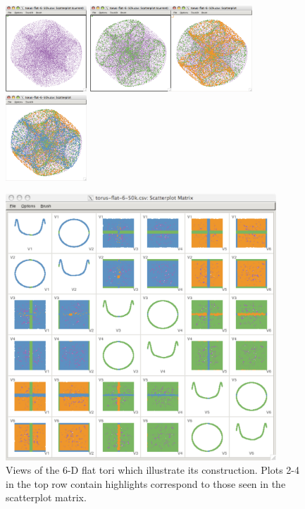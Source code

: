 \documentclass[article]{jss}
\begin{document}
\begin{figure}[ht]
\centerline{\includegraphics[width=1.2in]{torus-flat-6-0.pdf} \includegraphics[width=1.2in]{torus-flat-6-1.pdf}\includegraphics[width=1.2in]{torus-flat-6-2.pdf} \includegraphics[width=1.2in]{torus-flat-6-3.pdf}}
\centerline{\includegraphics[width=4in]{torus-flat-6-matrix.pdf}}
\caption{Views of the 6-D flat tori which illustrate its
  construction. Plots 2-4 in the top row contain highlights correspond
  to those seen in the scatterplot matrix.}
\label{flat2}
\end{figure}
\end{document}
